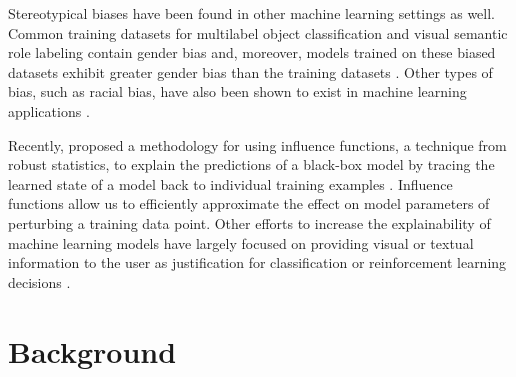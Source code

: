 \documentclass{article}
\begin{document}
Stereotypical biases have been found in other machine learning settings as well. Common training datasets for multilabel object classification and visual semantic role labeling contain gender bias and, moreover, models trained on these biased datasets exhibit greater gender bias than the training datasets \cite{shopping}. Other types of bias, such as racial bias, have also been shown to exist in machine learning applications \cite{MachineBias}.

Recently, \citet{Influence} proposed a methodology for using influence functions, a technique from robust statistics, to explain the predictions of a black-box model by tracing the learned state of a model back to individual training examples \cite{InfluenceOriginal}. 
Influence functions allow us to efficiently approximate the effect on model parameters of perturbing a training data point.
Other efforts to increase the explainability of machine learning models have largely focused on providing visual or textual information to the user as justification for classification or reinforcement learning decisions \cite{visualexp2,visualexp,exprobots}.


\section{Background}


\end{document}
